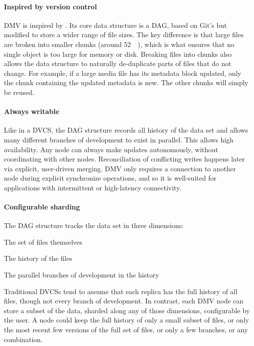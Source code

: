 

\paragraph{Inspired by version control}

\gls{DMV} is inspired by . Its core data structure is
a \gls{DAG}, based on Git's but modified to store a wider range of file sizes.
The key difference is that large files are broken into smaller chunks (around
\SI{52}{\kibi\byte}), which is what ensures that no single object is too large
for memory or disk. Breaking files into chunks also allows the data structure to
naturally de-duplicate parts of files that do not change. For example, if a
large media file has its metadata block updated, only the chunk containing the
updated metadata is new. The other chunks will simply be reused.


\paragraph{Always writable}

Like in a \gls{DVCS}, the \gls{DAG} structure records all history of the data
set and allows many different branches of development to exist in parallel. This
allows high availability. Any node can always make updates autonomously, without
coordinating with other nodes. Reconciliation of conflicting writes happens
later via explicit, user-driven merging. \gls{DMV} only requires a connection to
another node during explicit synchronize operations, and so it is well-suited
for applications with intermittent or high-latency connectivity.


\paragraph{Configurable sharding}

The \gls{DAG} structure tracks the data set in three dimensions:

\begin{tight_enumerate}
    \item The set of files themselves
    \item The history of the files
    \item The parallel branches of development in the history
\end{tight_enumerate}

Traditional \glspl{DVCS} tend to assume that each replica has the full history
of all files, though not every branch of development. In contrast, each
\gls{DMV} node can store a subset of the data, sharded along any of those
dimensions, configurable by the user. A node could keep the full history of only
a small subset of files, or only the most recent few versions of the full set of
files, or only a few branches, or any combination. 


